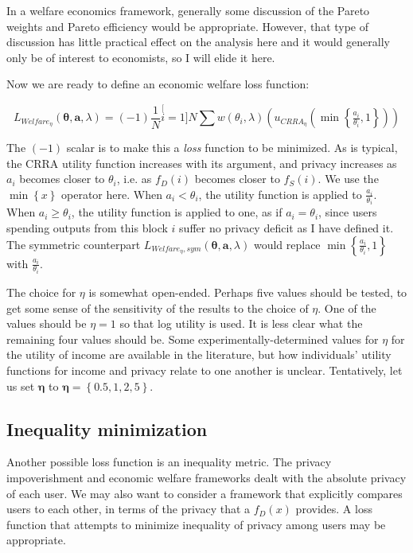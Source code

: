 \documentclass[english]{article}
\begin{document}
In a welfare economics framework, generally some discussion of the
Pareto weights and Pareto efficiency would be appropriate. However,
that type of discussion has little practical effect on the analysis
here and it would generally only be of interest to economists, so
I will elide it here.

Now we are ready to define an economic welfare loss function:

\begin{equation}
L_{Welfare_{\eta}}(\boldsymbol{\theta},\boldsymbol{a},\lambda)=\left(-1\right)\dfrac{1}{N}\stackrel[i=1]{N}{\sum}w(\theta_{i},\lambda)\left(u_{CRRA_{\eta}}\left(\min\left\{ \tfrac{a_{i}}{\theta_{i}},1\right\} \right)\right)\label{eq:L-Welfare}
\end{equation}

The $(-1)$ scalar is to make this a \textit{loss} function to be
minimized. As is typical, the CRRA utility function increases with
its argument, and privacy increases as $a_{i}$ becomes closer to
$\theta_{i}$, i.e. as $f_{D}(i)$ becomes closer to $f_{S}(i)$.
We use the $\min\left\{ x\right\} $ operator here. When $a_{i}<\theta_{i}$,
the utility function is applied to $\tfrac{a_{i}}{\theta_{i}}$. When
$a_{i}\geq\theta_{i}$, the utility function is applied to one, as
if $a_{i}=\theta_{i}$, since users spending outputs from this block
$i$ suffer no privacy deficit as I have defined it. The symmetric
counterpart $L_{Welfare_{\eta},sym}(\boldsymbol{\theta},\boldsymbol{a},\lambda)$
would replace $\min\left\{ \tfrac{a_{i}}{\theta_{i}},1\right\} $
with $\tfrac{a_{i}}{\theta_{i}}$.

The choice for $\eta$ is somewhat open-ended. Perhaps five values
should be tested, to get some sense of the sensitivity of the results
to the choice of $\eta$. One of the values should be $\eta=1$ so
that log utility is used. It is less clear what the remaining four
values should be. Some experimentally-determined values for $\eta$
for the utility of income are available in the literature, but how
individuals' utility functions for income and privacy relate to one
another is unclear. Tentatively, let us set $\boldsymbol{\eta}$ to
$\boldsymbol{\eta}=\left\{ 0.5,1,2,5\right\} $. 

\subsection{Inequality minimization}

Another possible loss function is an inequality metric. The privacy
impoverishment and economic welfare frameworks dealt with the absolute
privacy of each user. We may also want to consider a framework that
explicitly compares users to each other, in terms of the privacy that
a $f_{D}(x)$ provides. A loss function that attempts to minimize
inequality of privacy among users may be appropriate.
\end{document}

